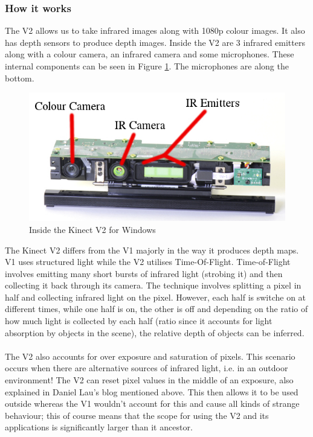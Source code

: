 \documentclass[11pt]{article}
\begin{document}
\subsubsection{How it works} 
The V2 allows us to take infrared images along with 1080p colour images. It 
also has depth sensors to produce depth images. Inside the V2 are 3 infrared
emitters along with a colour camera, an infrared camera and some microphones.
These internal components can be seen in Figure \ref{kinectinternal}. The
microphones are along the bottom.
\begin{center}
	\begin{figure}[H]
		\begin{center}
			\includegraphics[scale=0.5]{pics/kinectinternal}
				\caption{Inside the Kinect V2 for Windows}
				\label{kinectinternal}
		\end{center}
	\end{figure}
\end{center}

The Kinect V2 differs from the V1 majorly in the way it produces depth maps.
V1 uses structured light while the V2 utilises Time-Of-Flight. Time-of-Flight
involves emitting many short bursts of infrared light (strobing it) and then
collecting it back through its camera. 
The technique involves splitting a pixel in half and collecting infrared light
on the pixel. However, each half is switche on at different times, 
while one half is on, the other is off and depending on the ratio of
how much light is collected by each half (ratio since it accounts 
for light absorption by objects in the scene),
the relative depth of objects can be inferred. \\
\\
The V2 also accounts for over exposure and saturation of pixels. This scenario
occurs when there are alternative sources of infrared light, i.e. in an outdoor
environment! The V2 can reset pixel values in the middle of an exposure, also
explained in Daniel Lau's blog mentioned above. This then
allows it to be used outside whereas the V1 wouldn't account for this and cause
all kinds of strange behaviour; this of course means that the scope for using
the V2 and its applications is significantly larger than it ancestor.
\\ \\
\end{document}
